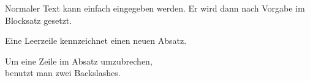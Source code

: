 \documentclass{article}
\begin{document}
Normaler Text kann einfach eingegeben werden.
Er wird dann nach Vorgabe im Blocksatz gesetzt.

Eine Leerzeile kennzeichnet einen neuen Absatz.

Um eine Zeile im Absatz umzubrechen,\\
benutzt man zwei Backslashes.
\end{document}

